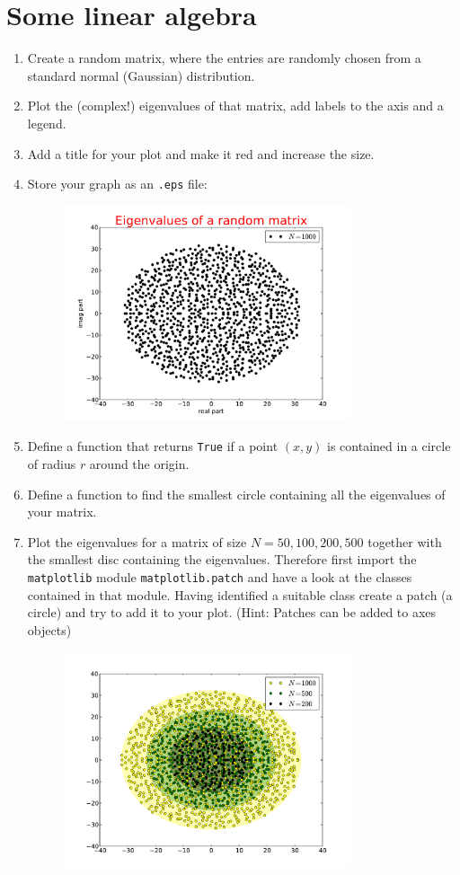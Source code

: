 \documentclass[smallheadings,12pt]{scrartcl}
\begin{document}
\section{Some linear algebra}
\begin{enumerate}
\item Create a random matrix, where the entries are randomly chosen from a standard normal (Gaussian) distribution.
\item Plot the (complex!) eigenvalues of that matrix, add labels to the axis and a legend.
\item Add a title for your plot and make it red and increase the size.
\item Store your graph as an {\tt .eps}  file:
\begin{figure}[H]
  \centering
  \includegraphics[width=0.8\textwidth]{pics/matrix1}
\end{figure}
\item Define a function that returns {\tt True}  if a point $(x,y)$ is contained in a circle of radius $r$ around the origin.
\item Define a function to find the smallest circle containing all the eigenvalues of your matrix.
\item Plot the eigenvalues for a matrix of size $N=50,100,200,500$ together with the smallest disc containing the eigenvalues.
Therefore first import the {\tt matplotlib} module {\tt matplotlib.patch} and have a look at the classes contained in that module. 
Having identified a suitable class create a patch (a circle) and try to add it to your plot. (Hint: Patches can be added to axes objects)
\begin{figure}[H]
  \centering
  \includegraphics[width=0.8\textwidth]{pics/matrix2}

\end{figure}
\end{enumerate}
\end{document}
